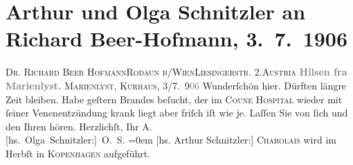 

         
         \renewcommand{\erwaehntePersonen}{Personen: Richard Beer-Hofmann, Georg Brandes, Olga Schnitzler}
         \renewcommand{\erwaehnteOrte}{Orte: Kommunehospitalet, Kopenhagen, Kurhotellet, Liesingerstraße, Marienlyst, Rodaun, Wien, Österreich}
         \renewcommand{\erwaehnteWerke}{Werke: Der Graf von Charolais. Ein Trauerspiel}
               \section[Arthur und Olga Schnitzler an Richard Beer-Hofmann, 3. 7. 1906]{ Arthur und Olga Schnitzler an Richard Beer-Hofmann, 3. 7. 1906}\nopagebreak{}\rehead{ }\begin{ledgroupsized}[t]{13cm}\normalsize\beginnumbering \toendnotes[C]{\smallbreak\pagebreak[2]} 
\pstart{}{\pb}\textsc{Dr. Richard Beer Hofmann}\pend{}\pstart{}\textsc{Rodaun b/Wien}\pend{}\pstart{}\textsc{Liesingerstr}. 2.\pend{}\pstart{}\textsc{Austria}\pend{}{\bigskip}\pstart
           \noindent{}\centering{}{\pb}\textcolor{gray}{\textbf{Hilsen fra Marienlyst.}}\pend
           \pstart
           \raggedleft{}\textsc{Marienlyst, Kurhaus}, 3/7. 9\textcolor{gray}{06}\pend
           \pstart
           Wunderſchön hier. Dürften längre Zeit bleiben. Habe geſtern Brandes beſucht, der im \textsc{Co{\geminationm}une Hospital} wieder mit ſeiner Venenentzündung krank liegt aber friſch iſt wie je.\pend
           \pstart
           Laſſen Sie von ſich und den Ihren hören. Herzlichſt,\pend
           \pstart
           Ihr \spacefill\mbox{A.}{\\[\baselineskip]}\spacefill\mbox{{[}hs. Olga Schnitzler:{]} O. S.}\pend
           \leftskip=0em{}\pstart
           {[}hs. Arthur Schnitzler:{]} \textsc{Charolais} wird im Herbſt in \textsc{Kopenhagen} aufgeführt.\pend
           

\end{ledgroupsized}
